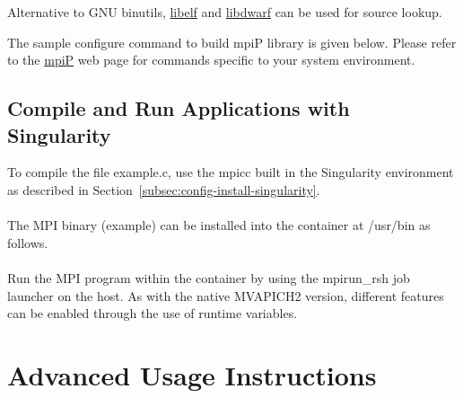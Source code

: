 \begin{itemize}
Alternative to GNU binutils, \href{http://directory.fsf.org/libs/misc/libelf.html}{libelf} and \href{https://github.com/tomhughes/libdwarf}{libdwarf} can be used for source lookup.

The sample configure command to build mpiP library is given below. Please refer to the \href{http://mpip.sourceforge.net}{mpiP} web page for commands specific to your system environment.


\end{itemize}


\subsection{Compile and Run Applications with Singularity}
\label{sec:compile-run-singularity}

To compile the file example.c, use the mpicc built in the Singularity
environment as described in Section~\ref{subsec:config-install-singularity}.\\

\\

\noindent The MPI binary (example) can be installed into the container at
/usr/bin as follows.\\

\\

\noindent Run the MPI program within the container by using the mpirun\_rsh job
launcher on the host. As with the native MVAPICH2 version, different features
can be enabled through the use of runtime variables.\\


\newpage

\section{Advanced Usage Instructions}
\label{sec:advanced_usage}

